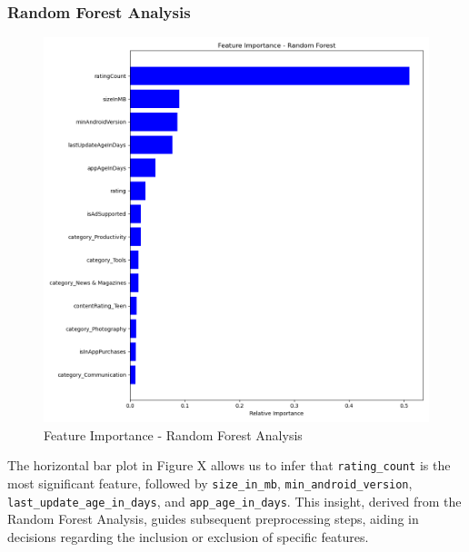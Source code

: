 \subsubsection{Random Forest Analysis}
\begin{figure}[h]
\centering
\includegraphics[width=\textwidth]{docs//assets/rfa.png}
\caption{Feature Importance - Random Forest Analysis}
\end{figure}
The horizontal bar plot in Figure X allows us to infer that \texttt{rating\_count} is the most significant feature, followed by \texttt{size\_in\_mb}, \texttt{min\_android\_version}, \texttt{last\_update\_age\_in\_days}, and \texttt{app\_age\_in\_days}. This insight, derived from the Random Forest Analysis, guides subsequent preprocessing steps, aiding in decisions regarding the inclusion or exclusion of specific features.

